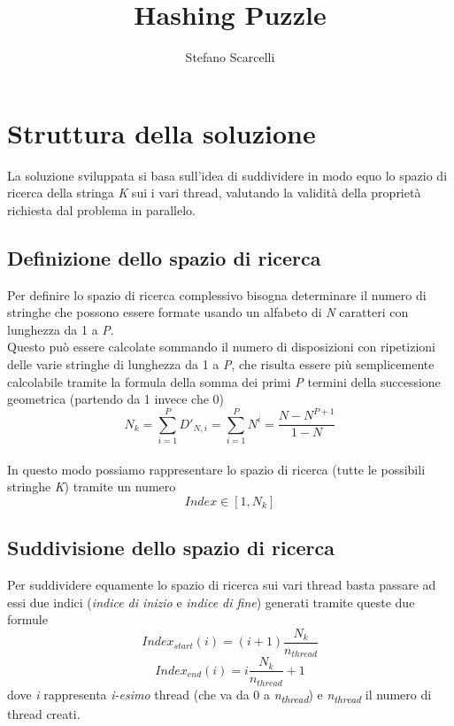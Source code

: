 \documentclass{article}
\title{Hashing Puzzle}
\author{Stefano Scarcelli}
\begin{document}
   \maketitle
   \newpage    %

   \tableofcontents
   \newpage    %

   \section{Struttura della soluzione}
   La soluzione sviluppata si basa sull'idea di suddividere in modo equo lo spazio di ricerca della stringa \textit{K} sui i vari thread, valutando la validità della proprietà richiesta dal problema in parallelo.

   \subsection{Definizione dello spazio di ricerca}
   Per definire lo spazio di ricerca complessivo bisogna determinare il numero di stringhe che possono essere formate usando un alfabeto di \textit{N} caratteri con lunghezza da 1 a \textit{P}.\\

   Questo può essere calcolate sommando il numero di disposizioni con ripetizioni delle varie stringhe di lunghezza da 1 a \textit{P}, che risulta essere più semplicemente calcolabile tramite la formula della somma dei primi \textit{P} termini della successione geometrica (partendo da 1 invece che 0)
   \[ N_{k} = \sum_{i=1}^{P} D'_{N,i} = \sum_{i=1}^{P} N^i = \frac{N-N^{P+1}}{1-N} \]
   \\
   In questo modo possiamo rappresentare lo spazio di ricerca (tutte le possibili stringhe \textit{K}) tramite un numero
   \[ Index \in [1, N_{k}] \]

   \subsection{Suddivisione dello spazio di ricerca}
   Per suddividere equamente lo spazio di ricerca sui vari thread basta passare ad essi due indici (\textsl{indice di inizio} e \textsl{indice di fine}) generati tramite queste due formule
   \[ Index_{start}(i) = (i+1)\frac{N_{k}}{n_{thread}} \]
   \[ Index_{end}(i) = i\frac{N_{k}}{n_{thread}}+1 \]
   dove \textit{i} rappresenta \textsl{i-esimo} thread (che va da 0 a \textit{n\textsubscript{thread}}) e \textit{n\textsubscript{thread}} il numero di thread creati.
\end{document}
